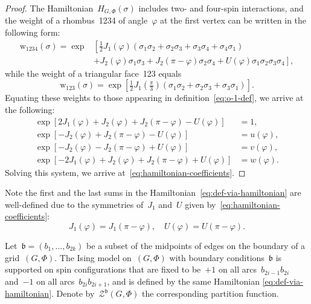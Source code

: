 \documentclass[reqno,11pt,a4paper]{amsart}
\theoremstyle{remark}
\renewcommand{\b}{\mathfrak{b}}
\newcommand{\weight}{\mathrm{w}}
\def\cZ{\mathcal Z}
\begin{document}
\begin{proof}
	The Hamiltonian~$H_{G,\Phi}(\sigma)$ includes two- and four-spin interactions, and the weight of a rhombus~1234 of angle~$\varphi$ at the first vertex can be written in the following form:
	\begin{align}
		\label{eq:hamiltonian-one-rhombus}
		\weight_{1234} (\sigma) 
		= \exp &\left [\tfrac12 J_1(\varphi)(\sigma_1\sigma_2 + \sigma_2\sigma_3 + \sigma_3\sigma_4 + \sigma_4\sigma_1)\right. \\
		&\left.+ J_2(\varphi)\sigma_1\sigma_3 + J_2(\pi -\varphi)\sigma_2\sigma_4 
		+ U(\varphi)\sigma_1\sigma_2\sigma_3\sigma_4 \right], \nonumber
	\end{align}
	while the weight of a triangular face~123 equals
	\[
		\weight_{123} (\sigma) = \exp \left [\tfrac12 J_1(\tfrac{\pi}{3})(\sigma_1\sigma_2 + \sigma_2\sigma_3 + \sigma_3\sigma_1)\right].
	\]
	Equating these weights to those appearing in definition~\eqref{eq:o-1-def}, we arrive at the following:
	\begin{align*}
		\exp[{2J_1(\varphi) + J_2(\varphi) + J_2(\pi -\varphi) - U(\varphi)}] &= 1,\\
		\exp[{-J_2(\varphi) + J_2(\pi -\varphi) - U(\varphi)}] &= u(\varphi),\\
		\exp[{-J_2(\varphi) - J_2(\pi -\varphi) + U(\varphi)}] &= v(\varphi),\\
		\exp[{-2J_1(\varphi) + J_2(\varphi) + J_2(\pi -\varphi) + U(\varphi)}] &= w(\varphi).
	\end{align*}
	Solving this system, we arrive at~\eqref{eq:hamiltonian-coefficients}.
\end{proof}

Note the first and the last sums in the Hamiltonian~\eqref{eq:def-via-hamiltonian} are well-defined due to the symmetries of~$J_1$ and~$U$ given by~\eqref{eq:hamiltonian-coefficients}:
\[
	J_{1}(\varphi) = J_{1}(\pi- \varphi), \quad U(\varphi) = U(\pi- \varphi).
\]

Let~$\b = (b_1, \dots, b_{2k})$ be a subset of the midpoints of edges on the boundary of a grid~$(G,\Phi)$. The Ising model on~$(G,\Phi)$ with boundary conditions~$\b$ is supported on spin configurations that are fixed to be~$+1$ on all arcs~$b_{2i-1}b_{2i}$ and~$-1$ on all arcs~$b_{2i}b_{2i+1}$, and is defined by the same Hamiltonian \eqref{eq:def-via-hamiltonian}. Denote by~$\cZ^\b(G,\Phi)$ the corresponding partition function.
\end{document}
